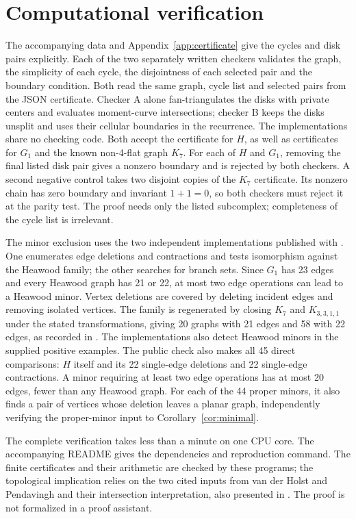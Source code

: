 \documentclass[11pt]{article}
\begin{document}
\section{Computational verification}
The accompanying data and Appendix~\ref{app:certificate} give the cycles
and disk pairs explicitly.
Each of the two separately written checkers validates the graph,
the simplicity of each cycle, the disjointness of each selected pair
and the boundary condition. Both read the same graph, cycle list and
selected pairs from the JSON
certificate. Checker A alone fan-triangulates the disks with private
centers and evaluates moment-curve intersections; checker B keeps the
disks unsplit and uses their cellular boundaries in the recurrence.
The implementations share no checking code.
Both accept the certificate for $H$, as well as certificates for
$G_1$ and the known non-4-flat graph $K_7$.
For each of $H$ and $G_1$, removing the final listed disk pair gives
a nonzero boundary and is rejected by both checkers. A second negative
control takes two disjoint copies of the $K_7$ certificate. Its nonzero
chain has zero boundary and invariant $1+1=0$, so both checkers must
reject it at the parity test.
The proof needs only the listed subcomplex; completeness of the cycle
list is irrelevant.

The minor exclusion uses the two independent implementations published
with \cite{Graham}. One enumerates edge deletions and contractions and
tests isomorphism against the Heawood family; the other searches for
branch sets. Since $G_1$ has 23 edges and every Heawood graph has 21 or
22, at most two edge operations can lead to a Heawood minor.
Vertex deletions are covered by deleting incident edges and removing
isolated vertices. The family is regenerated by closing $K_7$ and
$K_{3,3,1,1}$ under the stated transformations, giving 20 graphs with
21 edges and 58 with 22 edges, as recorded in \cite[\S2]{MPi}.
The implementations also detect Heawood minors in the supplied
positive examples. The public check also makes all 45 direct comparisons:
$H$ itself and its 22 single-edge deletions and 22 single-edge contractions. A minor requiring at least two edge
operations has at most 20 edges, fewer than any Heawood graph.
For each of the 44 proper minors, it also finds a pair of vertices whose
deletion leaves a planar graph, independently verifying the proper-minor
input to Corollary~\ref{cor:minimal}.

The complete verification takes less than a minute on one CPU core.
The accompanying README gives the dependencies and reproduction
command. The finite certificates and their arithmetic are checked
by these programs; the topological implication relies on the two
cited inputs from van der Holst and Pendavingh and their intersection
interpretation, also presented in \cite[Appendix B]{KT}. The proof is not formalized in a proof assistant.
\end{document}
